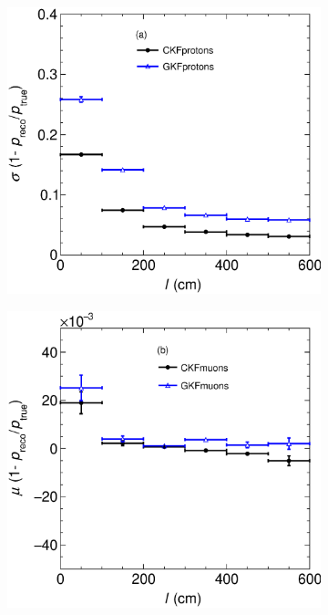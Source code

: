 \begin{figure}[t]
\begin{subfigure}{0.32\textwidth}
         \caption{}
         \label{fig:pResVSLength211_Int}
     \end{subfigure}
    \begin{subfigure}{0.32\textwidth}
         \centering
         \includegraphics[width=\textwidth]{figures/ch5-KF_NDGAr/FullSample/Int/pRes/2D/RespVSLength_2212.eps}
         \caption{}
         \label{fig:pResVSLength2212_Int}
     \end{subfigure}
          \begin{subfigure}{0.32\textwidth}
         \centering
         \includegraphics[width=\textwidth]{figures/ch5-KF_NDGAr/FullSample/Int/pRes/2D/BiaspVSLength_13.eps}

\end{subfigure}
\end{figure}

